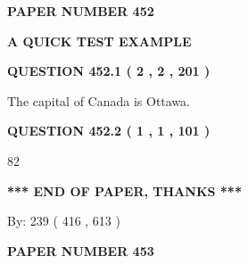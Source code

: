 \documentclass[12pt]{article}
\begin{document}
   
   
   
\newpage 
\setcounter{page}{ 
   452001 } 
   
   
   
   
 {\textbf{ \Large{ PAPER NUMBER  452  }}}
   
   
\vspace{0.2in}
   
   
   
   
   
   
 \vspace{0.2in}
{\LARGE {\textbf{ A QUICK TEST EXAMPLE}}}
   
   
  
\vspace{0.2in}
  
{\textbf{\Large{QUESTION
452.1 
 ( 2 , 2 , 201 )
}}}
  
  
 
 
\noindent{}
 
 
The capital of Canada is Ottawa.
 
 
 
 
  
\vspace{0.2in}
  
{\textbf{\Large{QUESTION
452.2 
 ( 1 , 1 , 101 )
}}}
  
  
 
 
\noindent{}

82
 
 
   
   
 \vspace{0.2in}
 
   
   
   
   
\vspace{1.0in} 
{\textbf{\large{ *** END OF PAPER, THANKS *** }}} 
   
   
\hspace{1.0in} By: 
 239 ( 416 ,  613 )
   
   
   
   
\newpage 
\setcounter{page}{ 
   453001 } 
   
   
   
   
 {\textbf{ \Large{ PAPER NUMBER  453  }}}
   
\end{document}
